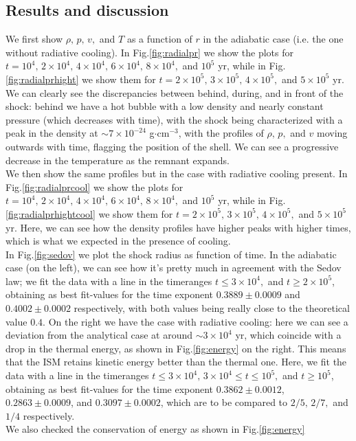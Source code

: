 \documentclass{article}
\begin{document}
\subsection{Results and discussion}
We first show $\rho,\,p,\,v,$ and $T$ as a function of $r$ in the adiabatic case (i.e. the one without radiative cooling). In Fig.\ref{fig:radialpr} we show the plots for $t=10^4,\,2\times10^4,\,4\times10^4,\,6\times10^4,\,8\times 10^4,$ and $10^5$ yr, while in Fig.\ref{fig:radialprhight} we show them for 
$t=2\times10^5,\,3\times10^5,\,4\times10^5,$ and $5\times10^5$ yr. We can clearly see the discrepancies between behind, during, and in front of the shock: behind we have a hot bubble with a low density and nearly constant pressure (which decreases with time), with the shock being characterized with a peak in the density at $\sim 7\times 10^{-24}$ g$\cdot$cm$^{-3}$,
with the profiles of $\rho,\,p,$ and $v$ moving outwards with time, flagging the position of the shell. We can see a progressive decrease in the temperature as the remnant expands.\\
We then show the same profiles but in the case with radiative cooling present. In Fig.\ref{fig:radialprcool} we show the plots for $t=10^4,\,2\times10^4,\,4\times10^4,\,6\times10^4,\,8\times 10^4,$ and $10^5$ yr, while in Fig.\ref{fig:radialprhightcool} we show them for 
$t=2\times10^5,\,3\times10^5,\,4\times10^5,$ and $5\times10^5$ yr. Here, we can see how the density profiles have higher peaks with higher times, which is what we expected in the presence of cooling. \\
In Fig.\ref{fig:sedov} we plot the shock radius as function of time. In the adiabatic case (on the left), we can see how it's pretty much in agreement with the Sedov law; 
we fit the data with a line in the timeranges $t\le3\times 10^{4},$ and $t\ge 2\times 10^5$, obtaining as best fit-values for the time exponent $ 0.3889\pm 0.0009$ and $0.4002\pm 0.0002$ respectively, with both values being really close to the theoretical value $0.4$. On the right we have the case with radiative cooling: here we can see a deviation from the analytical case at around $\sim 3\times 10^4$ yr, which coincide with a drop in the thermal energy, as shown in Fig.\ref{fig:energy} on the right. This means that the ISM retains kinetic energy better than the thermal one. Here, we fit the data with a line in the timeranges $t\le3\times 10^{4},\,3\times10^4\le t\le 10^5,$ and $t\ge 10^5$, obtaining as best fit-values for the time exponent 
$0.3862\pm0.0012$, $0.2863\pm 0.0009$, and $0.3097\pm 0.0002$, which are to be compared to $2/5,\,2/7,$ and $1/4$ respectively.\\
We also checked the conservation of energy as shown in Fig.\ref{fig:energy}
\end{document}
